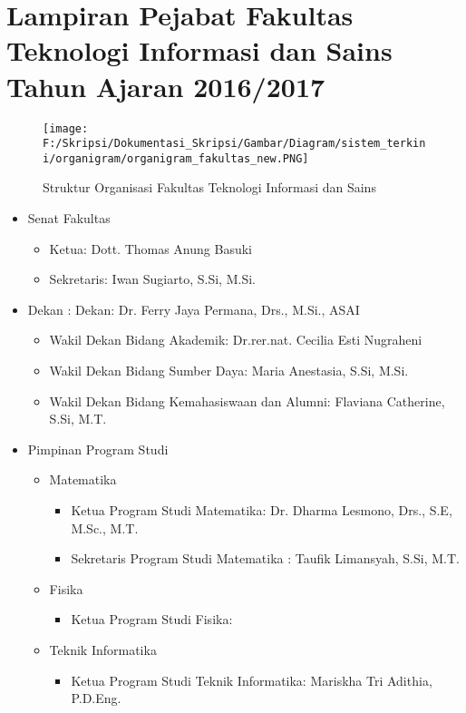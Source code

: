 \chapter{Lampiran Pejabat Fakultas Teknologi Informasi dan Sains Tahun Ajaran 2016/2017}
\label{lamp:H}

\begin{figure}[H]
	\centering
		\texttt{[image: F:/Skripsi/Dokumentasi\_Skripsi/Gambar/Diagram/sistem\_terkini/organigram/organigram\_fakultas\_new.PNG]}
	\caption{Struktur Organisasi Fakultas Teknologi Informasi dan Sains}
	\label{fig:organigram_fakultas}
\end{figure}
\begin{itemize}
	\item Senat Fakultas
	\begin{itemize}
		\item Ketua: Dott. Thomas Anung Basuki
		\item Sekretaris: Iwan Sugiarto, S.Si, M.Si.
	\end{itemize}
	\item Dekan : Dekan: Dr. Ferry Jaya Permana, Drs., M.Si., ASAI
	\begin{itemize}
		\item Wakil Dekan Bidang Akademik: Dr.rer.nat. Cecilia Esti Nugraheni
		\item Wakil Dekan Bidang Sumber Daya: Maria Anestasia, S.Si, M.Si.
		\item Wakil Dekan Bidang Kemahasiswaan dan Alumni: Flaviana Catherine, S.Si, M.T.
	\end{itemize}
	\item Pimpinan Program Studi
	\begin{itemize}
		\item Matematika
		\begin{itemize}
			\item Ketua Program Studi Matematika: Dr. Dharma Lesmono, Drs., S.E, M.Sc., M.T.
			\item Sekretaris Program Studi Matematika : Taufik Limansyah, S.Si, M.T.
		\end{itemize}
		\item Fisika
		\begin{itemize}
			\item Ketua Program Studi Fisika: 
		\end{itemize}
		\item Teknik Informatika
		\begin{itemize}
			\item Ketua Program Studi Teknik Informatika: Mariskha Tri Adithia, P.D.Eng.

\end{itemize}
\end{itemize}
\end{itemize}

